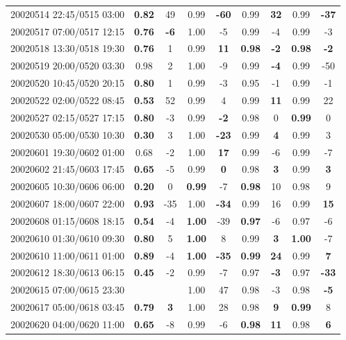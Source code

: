 \documentclass[linenumbers,draft]{agujournal}
\begin{document}
\begin{center}
\begin{longtable}{c||cc|cc|cc|cc}
20020514 22:45/0515 03:00 & \textbf{0.82} & 49 & 0.99 & \textbf{-60} & 0.99 & \textbf{32} & 0.99 & \textbf{-37} \\
20020517 07:00/0517 12:15 & \textbf{0.76} & \textbf{-6} & 1.00 & -5 & 0.99 & -4 & 0.99 & -3 \\
20020518 13:30/0518 19:30 & \textbf{0.76} & 1 & 0.99 & \textbf{11} & \textbf{0.98} & \textbf{-2} & \textbf{0.98} & \textbf{-2} \\
20020519 20:00/0520 03:30 & 0.98 & 2 & 1.00 & -9 & 0.99 & \textbf{-4} & 0.99 & -50 \\
20020520 10:45/0520 20:15 & \textbf{0.80} & 1 & 0.99 & -3 & 0.95 & -1 & 0.99 & -1 \\
20020522 02:00/0522 08:45 & \textbf{0.53} & 52 & 0.99 & 4 & 0.99 & \textbf{11} & 0.99 & 22 \\
20020527 02:15/0527 17:15 & \textbf{0.80} & -3 & 0.99 & \textbf{-2} & 0.98 & 0 & \textbf{0.99} & 0 \\
20020530 05:00/0530 10:30 & \textbf{0.30} & 3 & 1.00 & \textbf{-23} & 0.99 & \textbf{4} & 0.99 & 3 \\
20020601 19:30/0602 01:00 & 0.68 & -2 & 1.00 & \textbf{17} & 0.99 & -6 & 0.99 & -7 \\
20020602 21:45/0603 17:45 & \textbf{0.65} & -5 & 0.99 & \textbf{0} & 0.98 & \textbf{3} & 0.99 & \textbf{3} \\
20020605 10:30/0606 06:00 & \textbf{0.20} & 0 & \textbf{0.99} & -7 & \textbf{0.98} & 10 & 0.98 & 9 \\
20020607 18:00/0607 22:00 & \textbf{0.93} & -35 & 1.00 & \textbf{-34} & 0.99 & 16 & 0.99 & \textbf{15} \\
20020608 01:15/0608 18:15 & \textbf{0.54} & -4 & \textbf{1.00} & -39 & \textbf{0.97} & -6 & 0.97 & -6 \\
20020610 01:30/0610 09:30 & \textbf{0.80} & 5 & \textbf{1.00} & 8 & 0.99 & \textbf{3} & \textbf{1.00} & -7 \\
20020610 11:00/0611 01:00 & \textbf{0.89} & -4 & \textbf{1.00} & \textbf{-35} & \textbf{0.99} & \textbf{24} & 0.99 & \textbf{7} \\
20020612 18:30/0613 06:15 & \textbf{0.45} & -2 & 0.99 & -7 & 0.97 & \textbf{-3} & 0.97 & \textbf{-33} \\
20020615 07:00/0615 23:30 & & & 1.00 & 47 & 0.98 & -3 & 0.98 & \textbf{-5} \\
20020617 05:00/0618 03:45 & \textbf{0.79} & \textbf{3} & 1.00 & 28 & 0.98 & \textbf{9} & \textbf{0.99} & 8 \\
20020620 04:00/0620 11:00 & \textbf{0.65} & -8 & 0.99 & -6 & \textbf{0.98} & \textbf{11} & 0.98 & \textbf{6} \\

\end{longtable}
\end{center}
\end{document}
